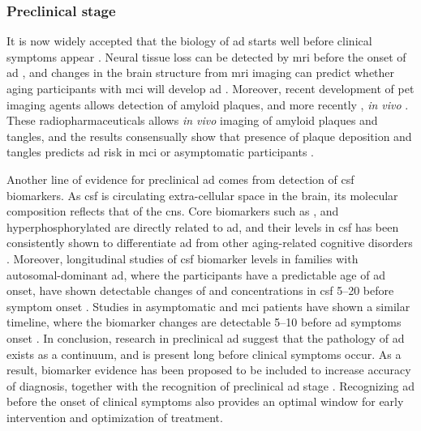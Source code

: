 \subsubsection{Preclinical stage}

It is now widely accepted that the biology of \gls{ad} starts well before clinical symptoms appear \citep{dubois16}. Neural tissue loss can be detected by \gls{mri} before the onset of \gls{ad} \citep{jack92, scheltens92, chetelat03}, and changes in the brain structure from \gls{mri} imaging can predict whether aging participants with \gls{mci} will develop \gls{ad} \citep{jack99}. Moreover, recent development of \gls{pet} imaging agents allows detection of amyloid plaques, and more recently \atau{}, \textit{in vivo} \citep{mathis03, maruyama13, okamura13}. These radiopharmaceuticals allows \textit{in vivo} imaging of amyloid plaques and \atau{} tangles, and the results consensually show that presence of plaque deposition and \atau{} tangles predicts \gls{ad} risk in \gls{mci} or asymptomatic participants \citep{klunk04, chien14, sepulcre16}.

Another line of evidence for preclinical \gls{ad} comes from detection of \gls{csf} biomarkers. As \gls{csf} is circulating extra-cellular space in the brain, its molecular composition reflects that of the \gls{cns}. Core biomarkers such as \abeta{}, \atau{} and hyperphosphorylated \atau{} are directly related to \gls{ad}, and their levels in \gls{csf} has been consistently shown to differentiate \gls{ad} from other aging-related cognitive disorders \citep{blennow10}. Moreover, longitudinal studies of \gls{csf} biomarker levels in families with autosomal-dominant \gls{ad}, where the participants have a predictable age of \gls{ad} onset, have shown detectable changes of \abeta{} and \atau{} concentrations in \gls{csf} \SIrange{5}{20}{\year} before symptom onset \citep{bateman12, fagan14}. Studies in asymptomatic and \gls{mci} patients have shown a similar timeline, where the biomarker changes are detectable \SIrange{5}{10}{\year} before \gls{ad} symptoms onset \citep{buchhave12, vos13}. 
In conclusion, research in preclinical \gls{ad} suggest that the pathology of \gls{ad} exists as a continuum, and is present long before clinical symptoms occur. As a result, biomarker evidence has been proposed to be included to increase accuracy of diagnosis, together with the recognition of preclinical \gls{ad} stage \citep{ad16}. Recognizing \gls{ad} before the onset of clinical symptoms also provides an optimal window for early intervention and optimization of treatment. 

